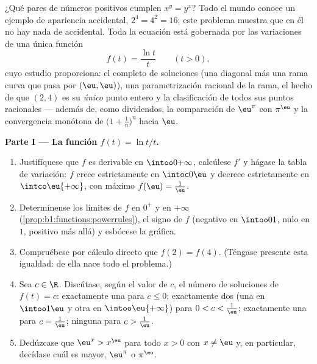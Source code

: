 \begin{problem}\label{pb:b1:functions:1}
¿Qué pares de números positivos cumplen $x^y = y^x$? Todo el mundo
conoce un ejemplo de apariencia accidental, $2^4 = 4^2 = 16$; este
problema muestra que en él no hay nada de accidental. Toda la ecuación
está gobernada por las variaciones de una única función
\[
f(t) = \frac{\ln t}{t} \qquad (t > 0),
\]
cuyo estudio proporciona: el  completo de soluciones (una
diagonal más una rama curva que pasa por $(\eu, \eu)$), una
parametrización racional de la rama, el hecho de que $(2, 4)$ es su
\emph{único} punto entero y la clasificación de todos sus puntos
racionales --- además de, como dividendos, la comparación de $\eu^\pi$
con $\pi^\eu$ y la convergencia monótona de
$\bigl(1 + \frac1n\bigr)^n$ hacia $\eu$.

\medskip
\noindent\textbf{Parte I --- La función $f(t) = \ln t / t$.}
\begin{enumerate}
  \item Justifíquese que $f$ es derivable en $\intoo0{+\infty}$,
        calcúlese $f'$ y hágase la tabla de variación: $f$ crece
        estrictamente en $\intoc0\eu$ y decrece estrictamente en
        $\intco\eu{+\infty}$, con máximo $f(\eu) = \frac1\eu$.
  \item Determínense los límites de $f$ en $0^+$ y en $+\infty$
        (\cref{prop:b1:functions:powerrules}), el signo de $f$
        (negativo en $\intoo01$, nulo en $1$, positivo más allá) y
        esbócese la gráfica.
  \item Compruébese por cálculo directo que $f(2) = f(4)$. (Téngase
        presente esta igualdad: de ella nace todo el problema.)
  \item Sea $c \in \R$. Discútase, según el valor de $c$, el número de
        soluciones de $f(t) = c$: exactamente una para $c \leq 0$;
        exactamente dos (una en $\intoo1\eu$ y otra en
        $\intoo\eu{+\infty}$) para $0 < c < \frac1\eu$; exactamente una
        para $c = \frac1\eu$; ninguna para $c > \frac1\eu$.
  \item Dedúzcase que $\eu^x > x^\eu$ para todo $x > 0$ con
        $x \neq \eu$ y, en particular, decídase cuál es mayor, $\eu^\pi$
        o $\pi^\eu$.
\end{enumerate}


\end{problem}
